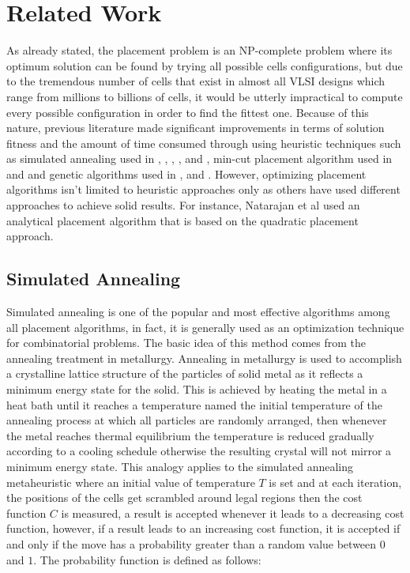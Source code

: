 \documentclass[conference]{IEEEtran}
\begin{document}

\section{Related Work}

As already stated, the placement problem is an NP-complete problem where its optimum solution can be found by trying all possible cells configurations, but due to the tremendous number of cells that exist in almost all VLSI designs which range from millions to billions of cells, it would be utterly impractical to compute every possible configuration in order to find the fittest one. Because of this nature, previous literature made significant improvements in terms of solution fitness and the amount of time consumed through using heuristic techniques such as simulated annealing used in \cite{b7}, \cite{b10}, \cite{b11}, \cite{b12}, \cite{b13} and \cite{b14}, min-cut placement algorithm used in \cite{b1} and \cite{b15} and genetic algorithms used in \cite{b2}, \cite{b3} and \cite{b7}. However, optimizing placement algorithms isn't limited to heuristic approaches only as others have used different approaches to achieve solid results. For instance, Natarajan et al \cite{b8} used an analytical placement algorithm that is based on the quadratic placement approach.

\subsection{Simulated Annealing}

Simulated annealing is one of the popular and most effective algorithms among all placement algorithms, in fact, it is generally used as an optimization technique for combinatorial problems. The basic idea of this method comes from the annealing treatment in metallurgy. Annealing in metallurgy is used to accomplish a crystalline lattice structure of the particles of solid metal as it reflects a minimum energy state for the solid. This is achieved by heating the metal in a heat bath until it reaches a temperature named the initial temperature of the annealing process at which all particles are randomly arranged, then whenever the metal reaches thermal equilibrium the temperature is reduced gradually according to a cooling schedule otherwise the resulting crystal will not mirror a minimum energy state. This analogy applies to the simulated annealing metaheuristic where an initial value of temperature $T$ is set and at each iteration, the positions of the cells get scrambled around legal regions then the cost function $C$ is measured, a result is accepted whenever it leads to a decreasing cost function, however, if a result leads to an increasing cost function, it is accepted if and only if the move has a probability greater than a random value between $0$ and $1$. The probability function is defined as follows:
\end{document}
